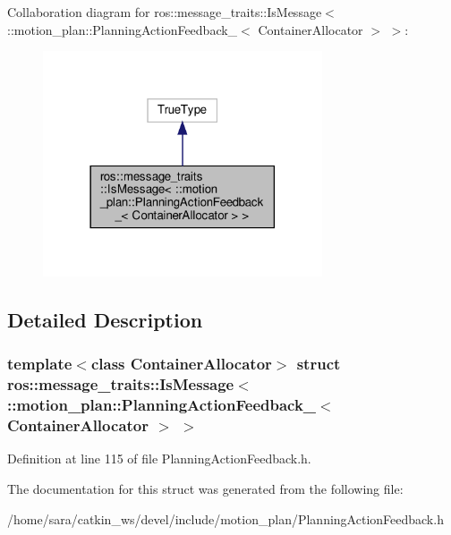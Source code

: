 Collaboration diagram for ros\+:\+:message\+\_\+traits\+:\+:Is\+Message$<$ \+:\+:motion\+\_\+plan\+:\+:Planning\+Action\+Feedback\+\_\+$<$ Container\+Allocator $>$ $>$\+:
\nopagebreak
\begin{figure}[H]
\begin{center}
\leavevmode
\includegraphics[width=234pt]{structros_1_1message__traits_1_1IsMessage_3_01_1_1motion__plan_1_1PlanningActionFeedback___3_01Caf7c5f0ed7f09d256770272cf3b7d109}
\end{center}
\end{figure}


\subsection{Detailed Description}
\subsubsection*{template$<$class Container\+Allocator$>$\newline
struct ros\+::message\+\_\+traits\+::\+Is\+Message$<$ \+::motion\+\_\+plan\+::\+Planning\+Action\+Feedback\+\_\+$<$ Container\+Allocator $>$ $>$}



Definition at line 115 of file Planning\+Action\+Feedback.\+h.



The documentation for this struct was generated from the following file\+:\begin{DoxyCompactItemize}
\item 
/home/sara/catkin\+\_\+ws/devel/include/motion\+\_\+plan/Planning\+Action\+Feedback.\+h\end{DoxyCompactItemize}
